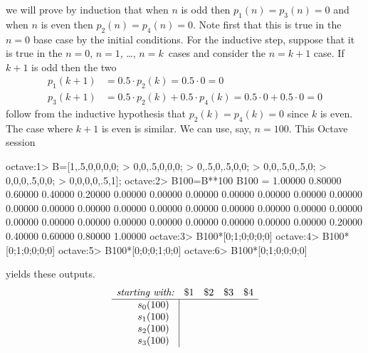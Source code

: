 \begin{ans}{1}
\begin{exparts}
\begin{equation*}
          \end{equation*}
          we will prove by induction that when $n$ is odd then
          $p_{1}(n)=p_{3}(n)=0$ and when $n$ is even then
          $p_{2}(n)=p_{4}(n)=0$.
          Note first that this is true in the $n=0$ base case by the initial
          conditions.
          For the inductive step, suppose that it is true in the
          $n=0$, $n=1$, \ldots, $n=k$~cases and consider the $n=k+1$ case.
          If $k+1$ is odd then the two
          \begin{align*}
             p_{1}(k+1) &= 0.5\cdot p_{2}(k)=0.5\cdot 0=0
                                                          \\
             p_{3}(k+1) &=0.5\cdot p_{2}(k)+0.5\cdot p_{4}(k)
                        =0.5\cdot 0+0.5\cdot 0
                        =0
          \end{align*}
          follow from the inductive hypothesis that
          $p_{2}(k)=p_{4}(k)=0$ since $k$ is even.
          The case where $k+1$ is even is similar.
        \partsitem We can use, say, $n=100$.
          This Octave session
\begin{computercode}
octave:1> B=[1,.5,0,0,0,0;
>             0,0,.5,0,0,0;
>             0,.5,0,.5,0,0;
>             0,0,.5,0,.5,0;
>             0,0,0,.5,0,0;
>             0,0,0,0,.5,1];
octave:2> B100=B**100
B100 =
  1.00000  0.80000  0.60000  0.40000  0.20000  0.00000
  0.00000  0.00000  0.00000  0.00000  0.00000  0.00000
  0.00000  0.00000  0.00000  0.00000  0.00000  0.00000
  0.00000  0.00000  0.00000  0.00000  0.00000  0.00000
  0.00000  0.00000  0.00000  0.00000  0.00000  0.00000
  0.00000  0.20000  0.40000  0.60000  0.80000  1.00000
octave:3> B100*[0;1;0;0;0;0]
octave:4> B100*[0;1;0;0;0;0]
octave:5> B100*[0;0;0;1;0;0]
octave:6> B100*[0;1;0;0;0;0]
\end{computercode}
        yields these outputs.
        \begin{equation*}
          \begin{array}{r|*{4}{c}}
            \multicolumn{1}{r}{\textit{starting with:}}
            &\text{\$1}  &\text{\$2}  &\text{\$3}  &\text{\$4} \\
             \hline
               \begin{array}{c}
                 s_{0}(100) \\
                 s_{1}(100) \\
                 s_{2}(100) \\
                 s_{3}(100) \\

\end{array}
\end{array}
\end{equation*}
\end{exparts}
\end{ans}
